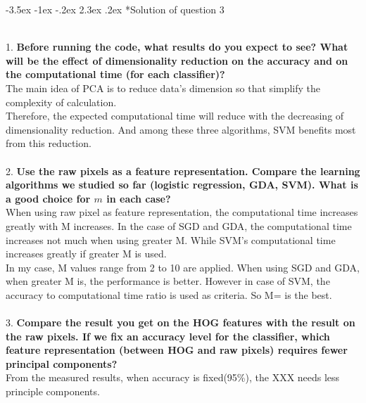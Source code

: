 \documentclass[12pt]{article}
\makeatletter
\renewcommand\section{\@startsection {section}{1}{\z@}%
	{-3.5ex \@plus -1ex \@minus -.2ex}%
	{2.3ex \@plus.2ex}%
	{\normalfont\large\bfseries}}%
\makeatother
\begin{document}
	\section*{Solution of question 3}
	\noindent
	\\
	1. \textbf{Before running the code, what results do you expect to see? What will be the effect of dimensionality reduction on the accuracy and on the computational time (for each classifier)?}\\
	The main idea of PCA is to reduce data's dimension so that simplify the complexity of calculation.\\
	Therefore, the expected computational time will reduce with the decreasing of dimensionality reduction. And among these three algorithms, SVM benefits most from this reduction.\\
	\\
	2. \textbf{Use the raw pixels as a feature representation. Compare the learning algorithms we studied so far (logistic regression, GDA, SVM). What is a good choice for $m$ in each case?}\\
	When using raw pixel as feature representation, the computational time increases greatly with M increases. In the case of SGD and GDA, the computational time increases not much when using greater M. While SVM's computational time increases greatly if greater M is used.\\
	In my case, M values range from 2 to 10 are applied. When using SGD and GDA, when greater M is, the performance is better. However in case of SVM, the accuracy to computational time ratio is used as criteria. So M= is the best.\\
	\\
	3. \textbf{Compare the result you get on the HOG features with the result on the raw pixels. If we fix an accuracy level for the classifier, which feature representation (between HOG and raw pixels) requires fewer principal components?}\\
	From the measured results, when accuracy is fixed(95\%), the XXX needs less principle components.\\
	
\end{document}
